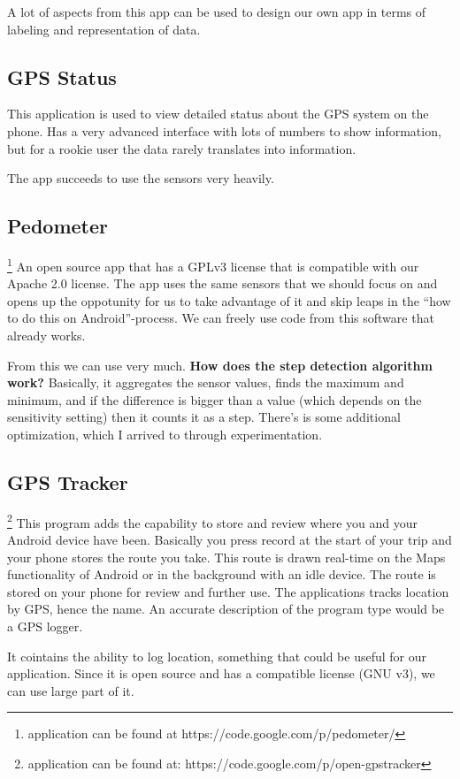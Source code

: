 A lot of aspects from this app can be used to design our own app in terms of labeling and representation of data.

\subsection{GPS Status}
This application is used to view detailed status about the GPS system on the phone. Has a very advanced interface with lots of numbers to show information, but for a rookie user the data rarely translates into information.

The app succeeds to use the sensors very heavily.

\subsection{Pedometer}\footnote{application can be found at https://code.google.com/p/pedometer/} 
An open source app that has a GPLv3 license that is compatible with our Apache 2.0 license. The app uses the same sensors that we should focus on and opens up the oppotunity for us to take advantage of it and skip leaps in the “how to do this on Android”-process. We can freely use code from this software that already works.

From this we can use very much.
\textbf{How does the step detection algorithm work?}
Basically, it aggregates the sensor values, finds the maximum and minimum, and if the difference is bigger than a value (which depends on the sensitivity setting) then it counts it as a step. There’s is some additional optimization, which I arrived to through experimentation.

\subsection{GPS Tracker}\footnote{application can be found at: https://code.google.com/p/open-gpstracker}
This program adds the capability to store and review where you and your Android device have been. Basically you press record at the start of your trip and your phone stores the route you take. This route is drawn real-time on the Maps functionality of Android or in the background with an idle device. The route is stored on your phone for review and further use. The applications tracks location by GPS, hence the name. An accurate description of the program type would be a GPS logger.

It cointains the ability to log location, something that could be useful for our application. Since it is open source and has a compatible license (GNU v3), we can use large part of it.


